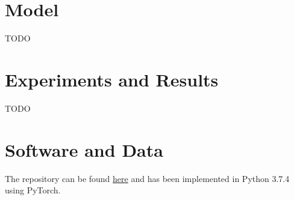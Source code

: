 \documentclass{article}
\begin{document}
\section{Model}
\label{model}
TODO

\section{Experiments and Results}
\label{experiments}
TODO

\medskip

\section*{Software and Data}
The repository can be found \href{https://github.com/deepeshhada/SABR}{here} and has been implemented in Python 3.7.4 using PyTorch.

\medskip



\end{document}
